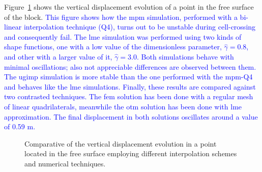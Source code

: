 \documentclass[preprint,12pt,a4paper]{elsarticle}
\begin{document}
Figure~\ref{fig:vertical-displacement-block} shows the vertical
displacement evolution of a point in the free surface of the
block. \textcolor{blue}{This figure shows how the \acrshort{mpm} simulation, performed with a bi-linear interpolation technique (Q4), turns out to be unstable during cell-crossing and consequently fail. The \acrshort{lme} simulation was performed using two kinds of shape functions, one with a low value of the dimensionless parameter, $\widehat{\gamma} = 0.8$, and other with a larger value of it, $\widehat{\gamma} = 3.0$. Both simulations behave with minimal oscillations; also not appreciable differences are observed between them. The \acrshort{ugimp} simulation is more stable than the one performed with the \acrshort{mpm}-Q4 and behaves like the \acrshort{lme} simulations. Finally, these results are compared against two contrasted techniques. The \acrshort{fem} solution has been done with a regular mesh of linear quadrilaterals, meanwhile the \acrshort{otm} solution has been done with \acrshort{lme} approximation. The final displacement in both solutions oscillates around a value of 0.59 m.} 
\begin{figure}
  \centering
  \caption{Comparative of the vertical displacement evolution in a
    point located in the free surface employing different
    interpolation schemes and numerical techniques.} 
  \label{fig:vertical-displacement-block}
\end{figure}
\end{document}
